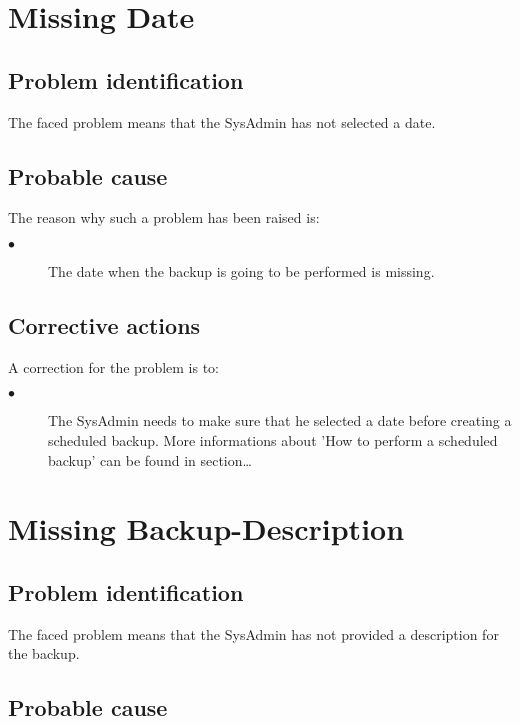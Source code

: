 \section{Missing Date} 

\subsection{Problem identification}
The faced problem means that the SysAdmin has not selected a date.

\subsection{Probable cause}

The reason why such a problem has been raised is:\\
\begin{description}
\item[$\bullet$] The date when the backup is going to be performed is missing.
\end{description}


\subsection{Corrective actions}

A correction for the problem is to:\\
\begin{description}
\item[$\bullet$] The SysAdmin needs to make sure that he selected a date before
creating a scheduled backup. More informations about 'How to perform a scheduled
backup' can be found in section\ldots

\end{description}







\section{Missing Backup-Description} 

\subsection{Problem identification}
The faced problem means that the SysAdmin has not provided a description for
the backup.

\subsection{Probable cause}

